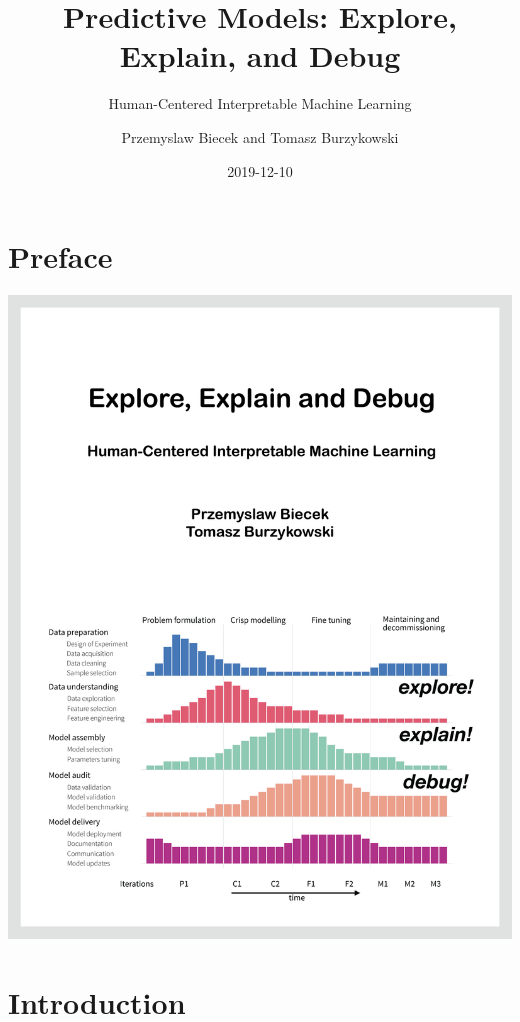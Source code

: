 \documentclass[12pt,]{krantz}
\title{Predictive Models: Explore, Explain, and Debug}
\subtitle{Human-Centered Interpretable Machine Learning}
\author{Przemyslaw Biecek and Tomasz Burzykowski}
\date{2019-12-10}
\begin{document}
\maketitle

{
\hypersetup{linkcolor=black}
\setcounter{tocdepth}{2}
\tableofcontents
}
\listoftables
\listoffigures
\hypertarget{preface}{%
\section*{Preface}\label{preface}}

\begin{center}\includegraphics[width=0.99\linewidth]{figure/front} \end{center}

\hypertarget{introduction}{%
\section{Introduction}\label{introduction}}
\end{document}

